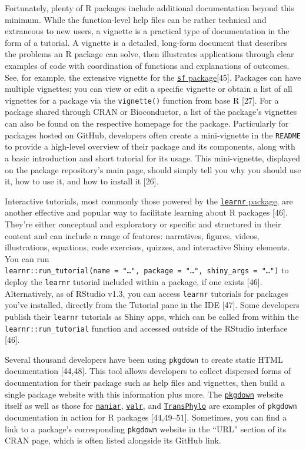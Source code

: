 \documentclass[10pt,letterpaper]{article}
\begin{document}
Fortunately, plenty of R packages include additional documentation
beyond this minimum. While the function-level help files can be rather
technical and extraneous to new users, a vignette is a practical type of
documentation in the form of a tutorial. A vignette is a detailed,
long-form document that describes the problems an R package can solve,
then illustrates applications through clear examples of code with
coordination of functions and explanations of outcomes. See, for
example, the extensive vignette for the
\href{https://cran.r-project.org/web/packages/sf/vignettes/sf1.html}{\texttt{sf}
package}{[}45{]}. Packages can have multiple vignettes; you can view or
edit a specific vignette or obtain a list of all vignettes for a package
via the \texttt{vignette()} function from base R {[}27{]}. For a package
shared through CRAN or Bioconductor, a list of the package's vignettes
can also be found on the respective homepage for the package.
Particularly for packages hosted on GitHub, developers often create a
mini-vignette in the \texttt{README} to provide a high-level overview of
their package and its components, along with a basic introduction and
short tutorial for its usage. This mini-vignette, displayed on the
package repository's main page, should simply tell you why you should
use it, how to use it, and how to install it {[}26{]}.

Interactive tutorials, most commonly those powered by the
\href{https://rstudio.github.io/learnr/}{\texttt{learnr} package}, are
another effective and popular way to facilitate learning about R
packages {[}46{]}. They're either conceptual and exploratory or specific
and structured in their content and can include a range of features:
narratives, figures, videos, illustrations, equations, code exercises,
quizzes, and interactive Shiny elements. You can run
\texttt{learnr::run\_tutorial(name\ =\ "\ldots{}",\ package\ =\ "\ldots{}",\ shiny\_args\ =\ "\ldots{}")}
to deploy the \texttt{learnr} tutorial included within a package, if one
exists {[}46{]}. Alternatively, as of RStudio v1.3, you can access
\texttt{learnr} tutorials for packages you've installed, directly from
the Tutorial pane in the IDE {[}47{]}. Some developers publish their
\texttt{learnr} tutorials as Shiny apps, which can be called from within
the \texttt{learnr::run\_tutorial} function and accessed outside of the
RStudio interface {[}46{]}.

Several thousand developers have been using \texttt{pkgdown} to create
static HTML documentation {[}44,48{]}. This tool allows developers to
collect dispersed forms of documentation for their package such as help
files and vignettes, then build a single package website with this
information plus more. The
\href{https://pkgdown.r-lib.org/}{\texttt{pkgdown}} website itself as
well as those for
\href{http://naniar.njtierney.com/index.html}{\texttt{naniar}},
\href{https://rnabioco.github.io/valr/}{\texttt{valr}}, and
\href{https://xavierdidelot.github.io/TransPhylo/articles/TransPhylo.html}{\texttt{TransPhylo}}
are examples of \texttt{pkgdown} documentation in action for R packages
{[}44,49--51{]}. Sometimes, you can find a link to a package's
corresponding \texttt{pkgdown} website in the ``URL'' section of its
CRAN page, which is often listed alongside its GitHub link.
\end{document}
